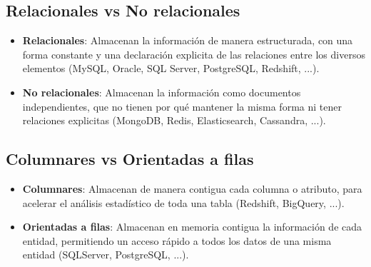 
\subsection{Relacionales vs No relacionales}

\begin{itemize}
    \item \textbf{Relacionales}: Almacenan la información de manera estructurada, con una forma constante y una declaración explicita de las relaciones entre los diversos elementos (MySQL, Oracle, SQL Server, PostgreSQL, Redshift, ...).
    \item \textbf{No relacionales}: Almacenan la información como documentos independientes, que no tienen por qué mantener la misma forma ni tener relaciones explicitas (MongoDB, Redis, Elasticsearch, Cassandra, ...).
\end{itemize}

\subsection{Columnares vs Orientadas a filas}

\begin{itemize}
    \item \textbf{Columnares}: Almacenan de manera contigua cada columna o atributo, para acelerar el análisis estadístico de toda una tabla (Redshift, BigQuery, ...).
    \item \textbf{Orientadas a filas}: Almacenan en memoria contigua la información de cada entidad, permitiendo un acceso rápido a todos los datos de una misma entidad (SQLServer, PostgreSQL, ...).
\end{itemize}
